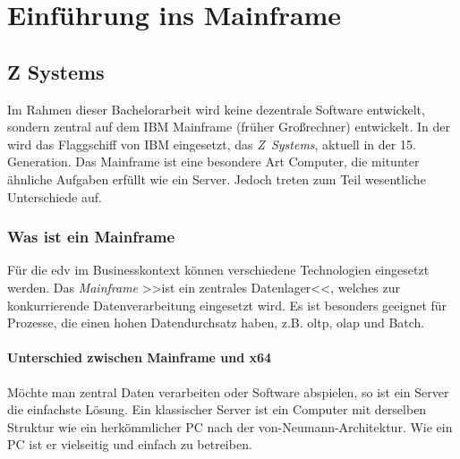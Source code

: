 \chapter{Einführung ins Mainframe}

\section{Z Systems}
Im Rahmen dieser Bachelorarbeit wird keine dezentrale Software entwickelt, sondern zentral auf dem IBM Mainframe (früher Großrechner) entwickelt.  In der \FirmenName wird das Flaggschiff von IBM eingesetzt, das \emph{Z~Systems}, aktuell in der 15. Generation. Das Mainframe ist eine besondere Art Computer, die mitunter ähnliche Aufgaben erfüllt wie ein Server. Jedoch treten zum Teil wesentliche Unterschiede auf.

\subsection{Was ist ein Mainframe}

Für die \ac{edv} im Businesskontext können verschiedene Technologien eingesetzt werden. Das \emph{Mainframe} >>ist ein zentrales Datenlager<<\cite{redbook.1}, welches zur konkurrierende Datenverarbeitung eingesetzt wird. Es ist besonders geeignet für Prozesse, die einen hohen Datendurchsatz haben, z.B. \ac{oltp}, \ac{olap} und Batch.


\subsubsection[Z Systems vs. x64]{Unterschied zwischen Mainframe und x64}

Möchte man zentral Daten verarbeiten oder Software abspielen, so ist ein Server die einfachste Lösung. Ein klassischer Server ist ein Computer mit derselben Struktur wie ein herkömmlicher PC nach der \mbox{von-Neumann-Architektur}. Wie ein PC ist er vielseitig und einfach zu betreiben.

